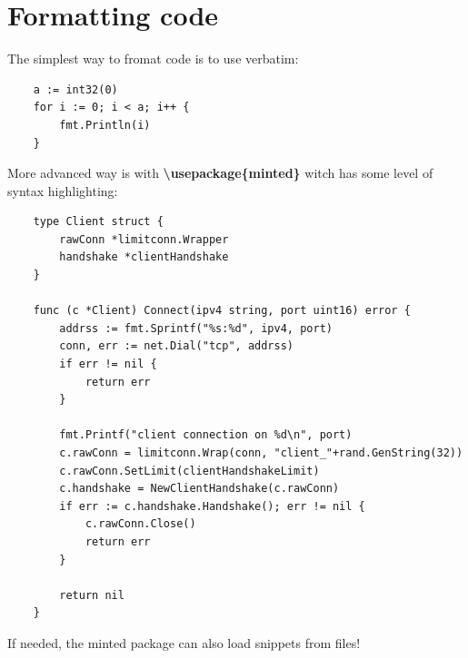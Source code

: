 \documentclass[12pt]{article}
\begin{document}
\section{Formatting code}

The simplest way to fromat code is to use verbatim:
\begin{verbatim}
    a := int32(0)
    for i := 0; i < a; i++ {
        fmt.Println(i)
    }
\end{verbatim}

\noindent More advanced way is with \textbf{\textbackslash usepackage\{minted\}} witch has some level of syntax highlighting:
\begin{verbatim}
    type Client struct {
        rawConn *limitconn.Wrapper
        handshake *clientHandshake
    }

    func (c *Client) Connect(ipv4 string, port uint16) error {
        addrss := fmt.Sprintf("%s:%d", ipv4, port)
        conn, err := net.Dial("tcp", addrss)
        if err != nil {
            return err
        }

        fmt.Printf("client connection on %d\n", port)
        c.rawConn = limitconn.Wrap(conn, "client_"+rand.GenString(32))
        c.rawConn.SetLimit(clientHandshakeLimit)
        c.handshake = NewClientHandshake(c.rawConn)
        if err := c.handshake.Handshake(); err != nil {
            c.rawConn.Close()
            return err
        }

        return nil
    }
\end{verbatim}

\noindent If needed, the minted package can also load snippets from files!

\newpage
\printbibliography
\end{document}
